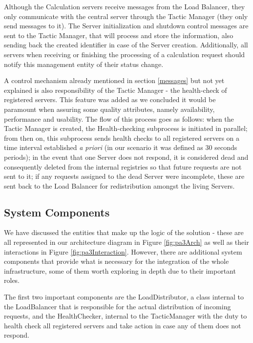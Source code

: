 \documentclass[12pt]{article}
\begin{document}
Although the Calculation servers receive messages from the Load Balancer, they only communicate with the central server through the Tactic Manager (they only 
send messages to it). 
The Server initialization and shutdown control messages are sent to the Tactic Manager, that will process and store the information, also sending back the 
created identifier in case of the Server creation.
Additionally, all servers when receiving or finishing the processing of a calculation request should notify this management entity of their status change.

A control mechanism already mentioned in section \ref{messages} but not yet explained is also responsibility of the Tactic Manager - the health-check of 
registered servers.
This feature was added as we concluded it would be paramount when assuring some quality attributes, namely availability, performance and usability.
The flow of this process goes as follows: when the Tactic Manager is created, the Health-checking subprocess is initiated in parallel; from then on, this
subprocess sends health checks to all registered servers on a time interval established \textit{a priori} (in our scenario it was defined as 30 seconds periods);
in the event that one Server does not respond, it is considered dead and consequently deleted from the internal registries so that future requests are not sent 
to it; if any requests assigned to the dead Server were incomplete, these are sent back to the Load Balancer for redistribution amongst the living Servers.

\subsection{System Components} %

We have discussed the entities that make up the logic of the solution - these are all represented in our architecture diagram in Figure \ref{fig:pa3Arch} as well
as their interactions in Figure \ref{fig:pa3Interaction}.
However, there are additional system components that provide what is necessary for the integration of the whole infrastructure, some of them worth exploring in 
depth due to their important roles.

The first two important components are the LoadDistributor, a class internal to the LoadBalancer that is responsible for the actual distribution of incoming requests, 
and the HealthChecker, internal to the TacticManager with the duty to health check all registered servers and take action in case any of them does not respond.
\end{document}
